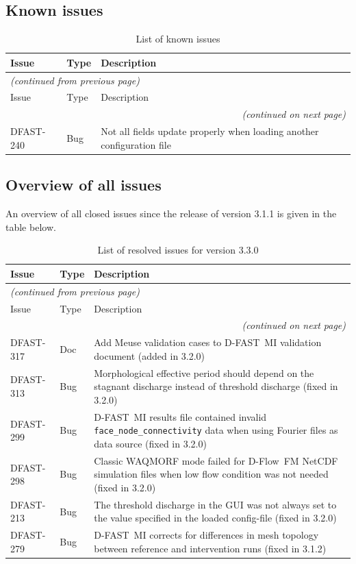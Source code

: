 \documentclass[git]{deltares_manual}
\newcommand{\dfmi}{\textrm{D-FAST~MI}\xspace}
\newcommand{\dflowfm}{\textrm{D-Flow~FM}\xspace}
\newcommand{\dfmiversion}{3.3.0}
\begin{document}
\subsection{Known issues}

\begin{longtable}{l|l|p{8cm}}
\caption{List of known issues} \\
Issue & Type & Description \\ \hline
\endfirsthead
\multicolumn{3}{l}{\textsl{(continued from previous page)}} \\
Issue & Type & Description \\ \hline
\endhead
\hline \multicolumn{3}{r}{\textsl{(continued on next page)}} \\
\endfoot
\endlastfoot 
DFAST-240 & Bug & Not all fields update properly when loading another configuration file \\
\end{longtable}

\subsection{Overview of all issues}

An overview of all closed issues since the release of version 3.1.1 is given in the table below.

\begin{longtable}{l|l|p{8cm}}
\caption{List of resolved issues for version \dfmiversion} \\
Issue & Type & Description \\ \hline
\endfirsthead
\multicolumn{3}{l}{\textsl{(continued from previous page)}} \\
Issue & Type & Description \\ \hline
\endhead
\hline \multicolumn{3}{r}{\textsl{(continued on next page)}} \\
\endfoot
\endlastfoot
DFAST-317 & Doc & Add Meuse validation cases to \dfmi validation document (added in 3.2.0) \\
DFAST-313 & Bug & Morphological effective period should depend on the stagnant discharge instead of threshold discharge (fixed in 3.2.0) \\
DFAST-299 & Bug & \dfmi results file contained invalid \texttt{face\_node\_connectivity} data when using Fourier files as data source (fixed in 3.2.0) \\
DFAST-298 & Bug & Classic WAQMORF mode failed for \dflowfm NetCDF simulation files when low flow condition was not needed (fixed in 3.2.0) \\
DFAST-213 & Bug & The threshold discharge in the GUI was not always set to the value specified in the loaded config-file (fixed in 3.2.0) \\
DFAST-279 & Bug & \dfmi corrects for differences in mesh topology between reference and intervention runs (fixed in 3.1.2) \\
\end{longtable}
\end{document}
